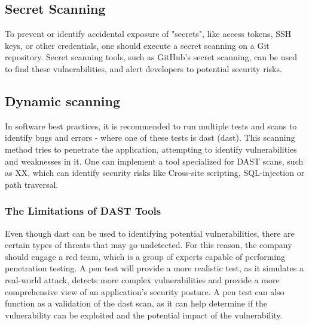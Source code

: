 \subsection{Secret Scanning}
To prevent or identify accidental exposure of "secrets", like access tokens, SSH keys, or other credentials, one should execute a secret scanning on a Git repository. Secret scanning tools, such as GitHub's secret scanning, can be used to find these vulnerabilities, and alert developers to potential security risks. \cite{GithubSecretScanning}


\subsection{Dynamic scanning}
In software best practices, it is recommended to run multiple tests and scans to identify bugs and errors - where one of these tests is \acrlong{dast} (\acrshort{dast}).\cite{bestpracticeSupplyChain} This scanning method tries to penetrate the application, attempting to identify vulnerabilities and weaknesses in it. One can implement a tool specialized for DAST scans, such as XX, which can identify security risks like \gls{Cross-site scripting}, \gls{SQL-injection} or path traversal.\cite{dynamictesting}


\subsubsection{The Limitations of DAST Tools}
Even though \acrshort{dast} can be used to identifying potential vulnerabilities, there are certain types of threats that may go undetected. For this reason, the company should engage a red team, which is a group of experts capable of performing penetration testing. A pen test will provide a more realistic test, as it simulates a real-world attack, detects more complex vulnerabilities and provide a more comprehensive view of an application's security posture. A pen test can also function as a validation of the \acrshort{dast} scan, as it can help determine if the vulnerability can be exploited and the potential impact of the vulnerability. \cite{dastpentesting}



